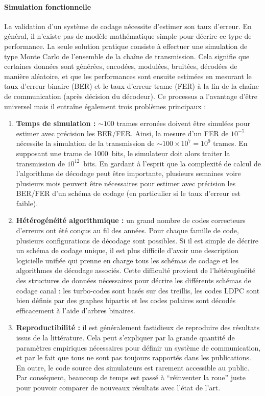 \paragraph{Simulation fonctionnelle}

La validation d'un système de codage nécessite d'estimer son taux d'erreur. En
général, il n'existe pas de modèle mathématique simple pour décrire ce type de
performance. La seule solution pratique consiste à effectuer une simulation
de type Monte Carlo de l'ensemble de la chaîne de transmission. Cela signifie
que certaines données sont générées, encodées, modulées, bruitées, décodées de
manière aléatoire, et que les performances sont ensuite estimées en mesurant le
taux d'erreur binaire (BER) et le taux d'erreur trame (FER) à la fin de la
chaîne de communication (après décision du décodeur). Ce processus a l'avantage
d'être universel mais il entraîne également trois problèmes principaux :

\begin{enumerate}
  \item \textbf{Temps de simulation :}
    $\sim 100$ trames erronées doivent être simulées pour estimer avec précision
    les BER/FER. Ainsi, la mesure d'un FER de $10^{-7}$ nécessite la simulation
    de la transmission de $\sim100\times 10^7=10^9$ trames. En supposant une
    trame de 1000~bits, le simulateur doit alors traiter la transmission de
    $10^{12}$~bits. En gardant à l'esprit que la complexité de calcul de
    l'algorithme de décodage peut être importante, plusieurs semaines voire
    plusieurs mois peuvent être nécessaires pour estimer avec précision les
    BER/FER d'un schéma de codage (en particulier si le taux d'erreur est
    faible).

  \item \textbf{Hétérogénéité algorithmique :}
    un grand nombre de codes correcteurs d'erreurs ont été conçus au fil des
    années. Pour chaque famille de code, plusieurs configurations de décodage
    sont possibles. Si il est simple de décrire un schéma de codage unique, il
    est  plus difficile d'avoir une description logicielle unifiée qui prenne en
    charge tous les schémas de codage et les algorithmes de décodage associés.
    Cette difficulté provient de l'hétérogénéité des structures de données
    nécessaires pour décrire les différents schémas de codage canal : les
    turbo-codes sont basés sur des treillis, les codes LDPC sont bien définis
    par des graphes bipartis et les codes polaires sont décodés efficacement à
    l'aide d'arbres binaires.

  \item \textbf{Reproductibilité :}
    il est généralement fastidieux de reproduire des résultats issus de la
    littérature. Cela peut s'expliquer par la grande quantité de paramètres
    empiriques nécessaires pour définir un système de communication, et par le
    fait que tous ne sont pas toujours rapportés dans les publications. En
    outre, le code source des simulateurs est rarement accessible au public.
    Par conséquent, beaucoup de temps est passé à ``réinventer la roue'' juste
    pour pouvoir comparer de nouveaux résultats avec l'état de l'art.
\end{enumerate}

